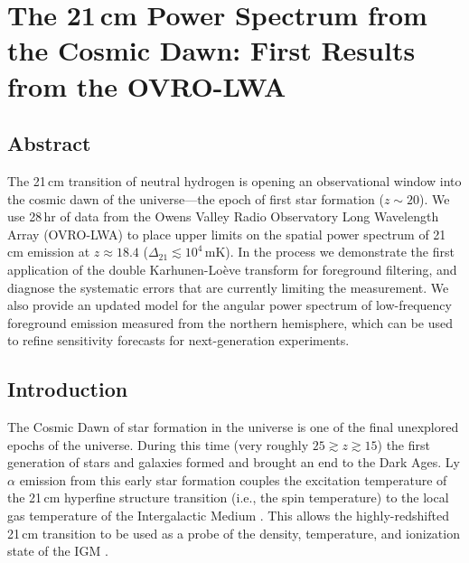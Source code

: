 \chapter{The 21\,cm Power Spectrum from the Cosmic Dawn: First Results from the OVRO-LWA}
\label{chapter4}

\begin{bibunit}

\section*{Abstract}
    The 21\,cm transition of neutral hydrogen is opening an observational window into the cosmic
    dawn of the universe---the epoch of first star formation ($z\sim 20$). We use 28\,hr of data
    from the Owens Valley Radio Observatory Long Wavelength Array (OVRO-LWA) to place upper limits
    on the spatial power spectrum of 21\,cm emission at $z \approx 18.4$ ($\Delta_{21} \lesssim
    10^4\,\text{mK}$). In the process we demonstrate the first application of the double
    Karhunen-Lo\`{e}ve transform for foreground filtering, and diagnose the systematic errors that
    are currently limiting the measurement. We also provide an updated model for the angular power
    spectrum of low-frequency foreground emission measured from the northern hemisphere, which can
    be used to refine sensitivity forecasts for next-generation experiments.

\section{Introduction}\label{sec:introduction}

The Cosmic Dawn of star formation in the universe is one of the final unexplored epochs of the
universe. During this time (very roughly $25 \gtrsim z \gtrsim 15$) the first generation of stars
and galaxies formed and brought an end to the Dark Ages. Ly$\alpha$ emission from this early star
formation couples the excitation temperature of the 21\,cm hyperfine structure transition (i.e., the
spin temperature) to the local gas temperature of the Intergalactic Medium
\citep[IGM;][]{1952AJ.....57R..31W, 1958PIRE...46..240F}. This allows the highly-redshifted 21\,cm
transition to be used as a probe of the density, temperature, and ionization state of the IGM
\citep[e.g.,][]{2006PhR...433..181F, 2012RPPh...75h6901P}.


\end{bibunit}
